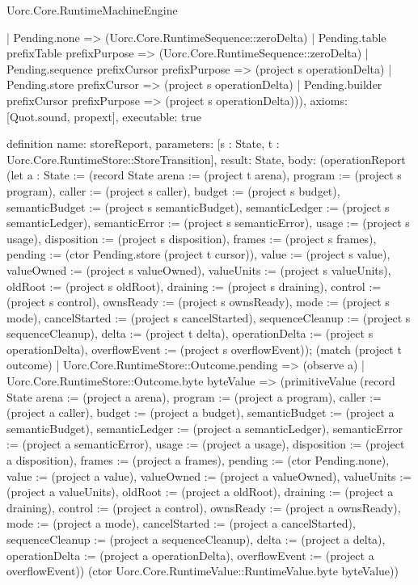 \begin{lexlean}{Uorc.Core.RuntimeMachineEngine}
\begin{semanticmodule}
{    | Pending.none => (Uorc.Core.RuntimeSequence::zeroDelta)
    | Pending.table prefixTable prefixPurpose => (Uorc.Core.RuntimeSequence::zeroDelta)
    | Pending.sequence prefixCursor prefixPurpose => (project s operationDelta)
    | Pending.store prefixCursor => (project s operationDelta)
    | Pending.builder prefixCursor prefixPurpose => (project s operationDelta))),
  axioms: [Quot.sound, propext],
  executable: true
}

definition{
  name: storeReport,
  parameters: [s : State, t : Uorc.Core.RuntimeStore::StoreTransition],
  result: State,
  body: (operationReport (let a : State := (record State {arena := (project t arena), program := (project s program), caller := (project s caller), budget := (project s budget), semanticBudget := (project s semanticBudget), semanticLedger := (project s semanticLedger), semanticError := (project s semanticError), usage := (project s usage), disposition := (project s disposition), frames := (project s frames), pending := (ctor Pending.store (project t cursor)), value := (project s value), valueOwned := (project s valueOwned), valueUnits := (project s valueUnits), oldRoot := (project s oldRoot), draining := (project s draining), control := (project s control), ownsReady := (project s ownsReady), mode := (project s mode), cancelStarted := (project s cancelStarted), sequenceCleanup := (project s sequenceCleanup), delta := (project t delta), operationDelta := (project s operationDelta), overflowEvent := (project s overflowEvent)}); (match (project t outcome)
    | Uorc.Core.RuntimeStore::Outcome.pending => (observe a)
    | Uorc.Core.RuntimeStore::Outcome.byte byteValue => (primitiveValue (record State {arena := (project a arena), program := (project a program), caller := (project a caller), budget := (project a budget), semanticBudget := (project a semanticBudget), semanticLedger := (project a semanticLedger), semanticError := (project a semanticError), usage := (project a usage), disposition := (project a disposition), frames := (project a frames), pending := (ctor Pending.none), value := (project a value), valueOwned := (project a valueOwned), valueUnits := (project a valueUnits), oldRoot := (project a oldRoot), draining := (project a draining), control := (project a control), ownsReady := (project a ownsReady), mode := (project a mode), cancelStarted := (project a cancelStarted), sequenceCleanup := (project a sequenceCleanup), delta := (project a delta), operationDelta := (project a operationDelta), overflowEvent := (project a overflowEvent)}) (ctor Uorc.Core.RuntimeValue::RuntimeValue.byte byteValue))
}
\end{semanticmodule}
\end{lexlean}
